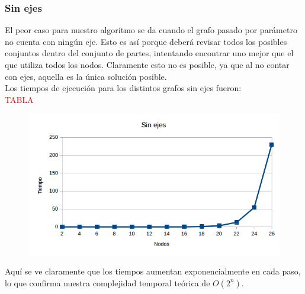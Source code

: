 \subsubsection{Sin ejes}
El peor caso para nuestro algoritmo se da cuando el grafo pasado por par\'ametro no cuenta con ning\'un eje. Esto es as\'i porque deber\'a revisar todos los posibles conjuntos dentro del conjunto de partes,
intentando encontrar uno mejor que el que utiliza todos los nodos. Claramente esto no es posible, ya que al no contar con ejes, aquella es la \'unica soluci\'on posible.\\
Los tiempos de ejecuci\'on para los distintos grafos sin ejes fueron:\\
\textcolor{red}{TABLA}

   \begin{figure}[h!]
   \begin{center}
 	\includegraphics[scale=0.7]{imagenes/exacto/Vacios.png}
	\label{Vacio}
   \end{center}
 \end{figure}

Aqu\'i se ve claramente que los tiempos aumentan exponencialmente en cada paso, lo que confirma nuestra complejidad temporal te\'orica de $O(2^n)$.
